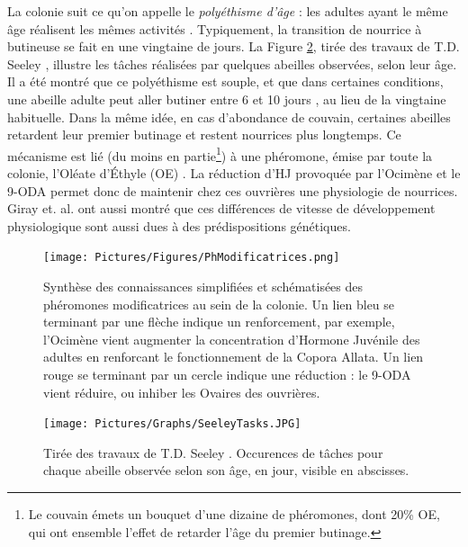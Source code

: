 			 La colonie suit ce qu'on appelle le \textit{polyéthisme d'âge} : les adultes ayant le même âge réalisent les mêmes activités \cite{seeley_age_1991}. Typiquement, la transition de nourrice à butineuse se fait en une vingtaine de jours. La Figure \ref{SeeleyTasks}, tirée des travaux de T.D. Seeley \cite{seeley_wisdom_1995}, illustre les tâches réalisées par quelques abeilles observées, selon leur âge. Il a été montré que ce polyéthisme est souple, et que dans certaines conditions, une abeille adulte peut aller butiner entre 6 et 10 jours \cite{giray_effects_1994}, au lieu de la vingtaine habituelle. Dans la même idée, en cas d'abondance de couvain, certaines abeilles retardent leur premier butinage et restent nourrices plus longtemps. Ce mécanisme est lié (du moins en partie\footnote{Le couvain émets un bouquet d'une dizaine de phéromones, dont 20\% OE, qui ont ensemble l'effet de retarder l'âge du premier butinage.}) à une phéromone, émise par toute la colonie, l'Oléate d'Éthyle (OE) \cite{le_conte_primer_2001}. La réduction d'HJ provoquée par l'Ocimène et le 9-ODA permet donc de maintenir chez ces ouvrières une physiologie de nourrices. Giray et. al. \cite{giray_effects_1994} ont aussi montré que ces différences de vitesse de développement physiologique sont aussi dues à des prédispositions génétiques.		 
			
			\begin{figure}
			\centering
				\texttt{[image: Pictures/Figures/PhModificatrices.png]}
				\caption[Synthèse des connaissances simplifiées et schématisées des phéromones modificatrices au sein de la colonie.]{Synthèse des connaissances simplifiées et schématisées des phéromones modificatrices au sein de la colonie. Un lien bleu se terminant par une flèche indique un renforcement, par exemple, l'Ocimène vient augmenter la concentration d'Hormone Juvénile des adultes en renforcant le fonctionnement de la Copora Allata. Un lien rouge se terminant par un cercle indique une réduction : le 9-ODA vient réduire, ou inhiber les Ovaires des ouvrières.}
				\label{phMod}
			\end{figure}	
			
			\begin{figure}
			\centering
				\texttt{[image: Pictures/Graphs/SeeleyTasks.JPG]}
				\caption{Tirée des travaux de T.D. Seeley \cite{seeley_wisdom_1995}. Occurences de tâches pour chaque abeille observée selon son âge, en jour, visible en abscisses.}
				\label{SeeleyTasks}
			\end{figure}	
			
